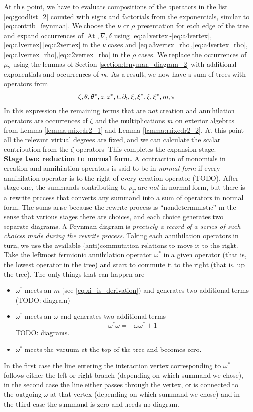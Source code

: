 \documentclass[english,letter paper,12pt,leqno]{article}
\theoremstyle{example}
\numberwithin{equation}{section}
\def\be{\begin{equation}}
\def\ee{\end{equation}}
\DeclareMathOperator{\vAt}{At}
\begin{document}
At this point, we have to evaluate compositions of the operators in the list \eqref{eq:goodlist_2} counted with signs and factorials from the exponentials, similar to \eqref{eq:contrib_feynman}. We choose the $\nu$ or $\rho$ presentation for each edge of the tree and expand occurrences of $\vAt, \nabla, \delta$ using \eqref{eq:a1vertex}-\eqref{eq:a4vertex}, \eqref{eq:c1vertex},\eqref{eq:c2vertex} in the $\nu$ cases and \eqref{eq:a3vertex_rho},\eqref{eq:a4vertex_rho},\eqref{eq:c1vertex_rho},\eqref{eq:c2vertex_rho} in the $\rho$ cases. We replace the occurrences of $\mu_2$ using the lemmas of Section \ref{section:fenyman_diagram_2} with additional exponentials and occurrences of $m$. As a result, we now have a sum of trees with operators from
\be\label{eq:goodlist_3}
\zeta, \theta, \theta^*, z, z^*, t, \partial_t, \xi, \xi^*, \Bar{\xi}, \Bar{\xi}^*, m, \pi
\ee
In this expression the remaining terms that are \emph{not} creation and annihilation operators are occurrences of $\zeta$ and the multiplications $m$ on exterior algebras from Lemma \ref{lemma:mixedr2_1} and Lemma \ref{lemma:mixedr2_2}. At this point all the relevant virtual degrees are fixed, and we can calculate the scalar contribution from the $\zeta$ operators. This completes the expansion stage.
\\

\textbf{Stage two: reduction to normal form.} A contraction of monomials in creation and annihilation operators is said to be in \emph{normal form} if every annihilation operator is to the right of every creation operator (TODO). After stage one, the summands contributing to $\rho_T$ are \emph{not} in normal form, but there is a rewrite process that converts any summand into a sum of operators in normal form. The sums arise because the rewrite process is ``nondeterministic'' in the sense that various stages there are choices, and each choice generates two separate diagrams. A Feynman diagram is \emph{precisely a record of a series of such choices made during the rewrite process.} Taking each annihilation operators in turn, we use the available (anti)commutation relations to move it to the right. Take the leftmost fermionic annihilation operator $\omega^*$ in a given operator (that is, the lowest operator in the tree) and start to commute it to the right (that is, up the tree). The only things that can happen are
\begin{itemize}
\item $\omega^*$ meets an $m$ (see \eqref{eq:xi_is_derivation}) and generates two additional terms (TODO: diagram)
\item $\omega^*$ meets an $\omega$ and generates two additional terms
\[
\omega^* \omega = - \omega \omega^* + 1
\]
TODO: diagrams.
\item $\omega^*$ meets the vacuum at the top of the tree and becomes zero.
\end{itemize}
In the first case the line entering the interaction vertex corresponding to $\omega^*$ follows either the left or right branch (depending on which summand we chose), in the second case the line either passes through the vertex, or is connected to the outgoing $\omega$ at that vertex (depending on which summand we chose) and in the third case the summand is zero and needs no diagram. 
\end{document}
